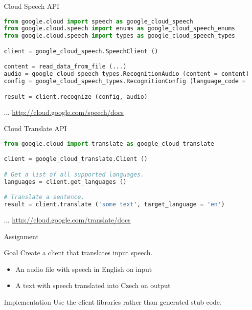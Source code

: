 \begin{frame}[fragile]{Cloud Speech API}
\begin{lstlisting}[language=python,style=mini]
from google.cloud import speech as google_cloud_speech
from google.cloud.speech import enums as google_cloud_speech_enums
from google.cloud.speech import types as google_cloud_speech_types

client = google_cloud_speech.SpeechClient ()

content = read_data_from_file (...)
audio = google_cloud_speech_types.RecognitionAudio (content = content)
config = google_cloud_speech_types.RecognitionConfig (language_code = 'en-US')

result = client.recognize (config, audio)
\end{lstlisting}
    \bigskip
    \hfill ... \url{http://cloud.google.com/speech/docs}
\end{frame}


\begin{frame}[fragile]{Cloud Translate API}
\begin{lstlisting}[language=python,style=mini]
from google.cloud import translate as google_cloud_translate

client = google_cloud_translate.Client ()

# Get a list of all supported languages.
languages = client.get_languages ()

# Translate a sentence.
result = client.translate ('some text', target_language = 'en')
\end{lstlisting}
    \bigskip
    \hfill ... \url{http://cloud.google.com/translate/docs}
\end{frame}


\begin{frame}{Assignment}
    \begin{block}{Goal}
        Create a client that translates input speech.
        \begin{itemize}
            \item An audio file with speech in English on input
            \item A text with speech translated into Czech on output
        \end{itemize}
    \end{block}

    \bigskip

    \begin{block}{Implementation}
        Use the client libraries rather than generated stub code.
    \end{block}
\end{frame}
